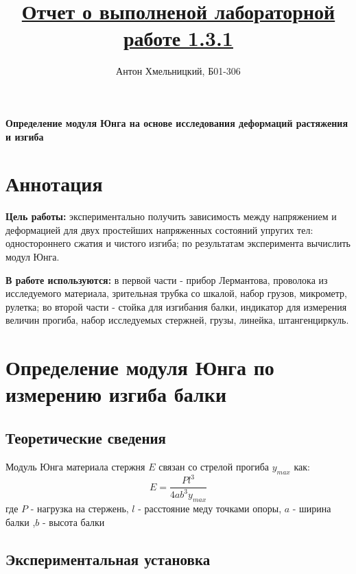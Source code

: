 \documentclass[a4paper]{article}
\title{\underline{Отчет о выполненой лабораторной работе 1.3.1}}
\author{Антон Хмельницкий, Б01-306}
\begin{document}
\maketitle
\textbf{Определение модуля Юнга на основе исследования деформаций растяжения и изгиба}

\section{Аннотация}
    \par \textbf{Цель работы:} экспериментально получить зависимость между напряжением и деформацией
    для двух простейших напряженных состояний упругих тел: одностороннего сжатия и чистого изгиба;
    по результатам эксперимента вычислить модул Юнга.\\
    \par \noindent \textbf{В работе используются:} в первой части - прибор Лермантова, проволока
    из исследуемого материала,
     зрительная трубка со шкалой,
    набор грузов, микрометр, рулетка;  во второй части - стойка для изгибания балки, индикатор для
    измерения величин прогиба,
набор исследуемых стержней, грузы, линейка, штангенциркуль.


\section{Определение модуля Юнга по измерению изгиба балки}

\subsection{Теоретические сведения}
Модуль Юнга материала стержня $E$ связан со стрелой прогиба $y_{max}$ как:
\begin{equation}\label{balka}
    E=\frac{Pl^3}{4ab^3y_{max}}
\end{equation}
где $P$ - нагрузка на стержень, $l$ - расстояние меду точками опоры,
$a$ - ширина балки ,$b$ - высота балки

\subsection{Экспериментальная установка}
\end{document}
